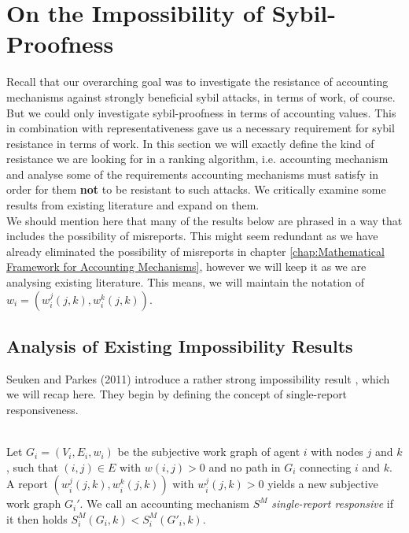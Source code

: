 \chapter{On the Impossibility of Sybil-Proofness}
\label{chap:On the Impossibility of Sybil-Proofness}
\noindent{}Recall that our overarching goal was to investigate the resistance of accounting mechanisms against strongly beneficial sybil attacks, in terms of work, of course. But we could only investigate sybil-proofness in terms of accounting values. This in combination with representativeness gave us a necessary requirement for sybil resistance in terms of work. In this section we will exactly define the kind of resistance we are looking for in a ranking algorithm, i.e. accounting mechanism and analyse some of the requirements accounting mechanisms must satisfy in order for them \textbf{not} to be resistant to such attacks. We critically examine some results from existing literature and expand on them.\vspace{1em}\\

\noindent{}We should mention here that many of the results below are phrased in a way that includes the possibility of misreports. This might seem redundant as we have already eliminated the possibility of misreports in chapter \ref{chap:Mathematical Framework for Accounting Mechanisms}, however we will keep it as we are analysing existing literature. This means, we will maintain the notation of $w_i=(w_i^j(j,k),w_i^k(j,k))$.\vspace{1em}\\


\section{Analysis of Existing Impossibility Results}
\label{Analysis of Existing Impossibility Results}
\noindent{}Seuken and Parkes (2011) introduce a rather strong impossibility result \cite{On the Sybil-Proofness of Accounting Mechanisms}, which we will recap here. They begin by defining the concept of single-report responsiveness. 

\begin{definition}\ \\
\label{def:Single-Report Responsiveness}
\noindent{}Let $G_i=(V_i,E_i,w_i)$ be the subjective work graph of agent $i$ with nodes $j$ and $k$, such that $(i,j)\in{}E$ with $w(i,j)>0$ and no path in $G_i$ connecting $i$ and $k$. A report $(w^j_i(j,k),w^k_i(j,k))$ with $w^j_i(j,k)>0$ yields a new subjective work graph $G_i'$. We call an accounting mechanism $S^M$ {\it single-report responsive} if it then holds $S^M_i(G_i,k)<S^M_i(G'_i,k)$. \vspace{1em}\\
\end{definition}

